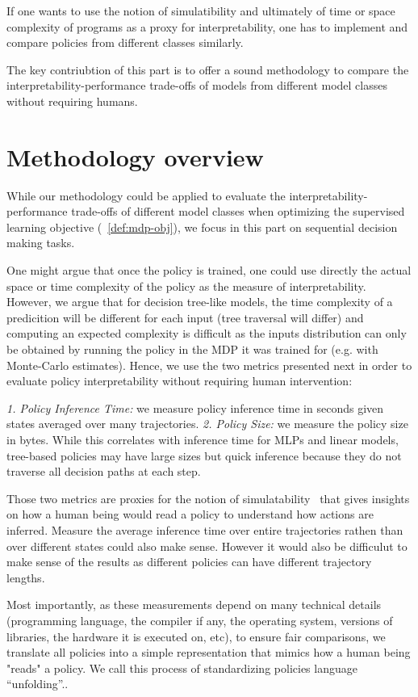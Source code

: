 If one wants to use the notion of simulatibility and ultimately of time or space complexity of programs as a proxy for interpretability, one has to implement and compare policies from different classes similarly.

The key contriubtion of this part is to offer a sound methodology to compare the interpretability-performance trade-offs of models from different model classes without requiring humans.

\section{Methodology overview}\label{sec:unfold}
While our methodology could be applied to evaluate the interpretability-performance trade-offs of different model classes when optimizing the supervised learning objective (~\ref{def:mdp-obj}), we focus in this part on sequential decision making tasks.

One might argue that once the policy is trained, one could use directly the actual space or time complexity of the policy as the measure of interpretability.
However, we argue that for decision tree-like models, the time complexity of a predicition will be different for each input (tree traversal will differ) and computing an expected complexity is difficult as the inputs distribution can only be obtained by running the policy in the MDP it was trained for (e.g. with Monte-Carlo estimates).  
Hence, we use the two metrics presented next in order to evaluate policy interpretability without requiring human intervention:

\textit{1. Policy Inference Time:} we measure policy inference time in seconds given states averaged over many trajectories.
\textit{2. Policy Size:} we measure the policy size in bytes. While this correlates with inference time for MLPs and linear models, tree-based policies may have large sizes but quick inference because they do not traverse all decision paths at each step.

Those two metrics are proxies for the notion of simulatability~\cite{mythos} that gives insights on how a human being would read a policy to understand how actions are inferred.
Measure the average inference time over entire trajectories rathen than over different states could also make sense.
However it would also be difficulut to make sense of the results as different policies can have different trajectory lengths.

Most importantly, as these measurements depend on many technical details (programming language, the compiler if any, the operating system, versions of libraries, the hardware it is executed on, etc), to ensure fair comparisons, we translate all policies into a simple representation that mimics how a human being "reads" a policy.
We call this process of standardizing policies language ``unfolding''..

